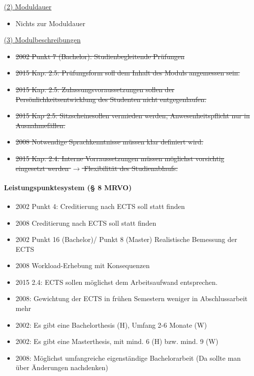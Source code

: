         \underline{(2) Moduldauer}
          \begin{itemize}
            \item Nichts zur Moduldauer
          \end{itemize}

        \underline{(3) Modulbeschreibungen}
          \begin{itemize}
            \item \sout{2002 Punkt 7 (Bachelor): Studienbegleitende Prüfungen}
            \item \sout{2015 Kap. 2.5: Prüfungsform soll dem Inhalt des Moduls angemessen sein.}
            \item \sout{2015 Kap. 2.5: Zulassungsvoraussetzungen sollen der Persönlichkeitsentwicklung des Studenten nicht entgegenlaufen.}
            \item \sout{2015 Kap 2.5:  \flqq Sitzscheine\frqq sollen vermieden werden, Anwesenheitspflicht nur in Ausnahmefällen.}
            \item \sout{2008 Notwendige Sprachkenntnisse müssen klar definiert wird.}
            \item \sout{2015 Kap. 2.4: Interne Vorraussetzungen müssen möglichst vorsichtig eingesetzt werden $\rightarrow$ Flexibilität des Studienablaufs.}
          \end{itemize}




    \paragraph*{Leistungspunktesystem (§ 8 MRVO)}
      \begin{itemize}
        \item 2002 Punkt 4: Creditierung nach ECTS soll statt finden
        \item 2008 Creditierung nach ECTS soll statt finden
        \item 2002 Punkt 16 (Bachelor)/ Punkt 8 (Master) Realistische Bemessung der ECTS
        \item 2008 Workload-Erhebung mit Konsequenzen
        \item 2015 2.4: ECTS sollen möglichst dem Arbeitsaufwand entsprechen.
        \item 2008: Gewichtung der ECTS in frühen Semestern weniger in Abschlussarbeit mehr
        \item 2002: Es gibt eine Bachelorthesis (H), Umfang 2-6 Monate (W)
        \item 2002: Es gibt eine Masterthesis, mit mind. 6 (H) bzw. mind. 9 (W)
        \item 2008: Möglichst umfangreiche eigenständige Bachelorarbeit (Da sollte man über Änderungen nachdenken)
      \end{itemize}

